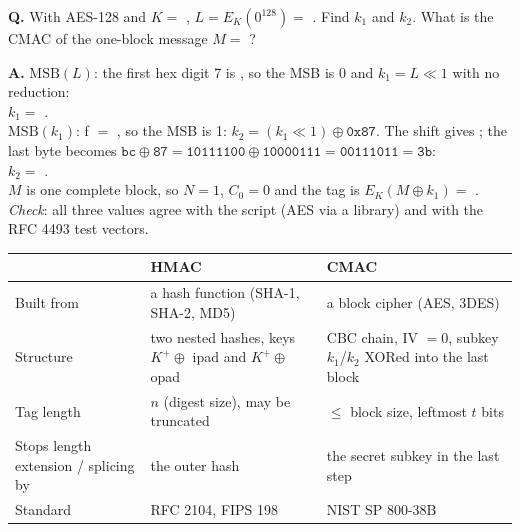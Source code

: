 \begin{worked}
\textbf{Q.} With AES-128 and $K = $ , $L = E_K(0^{128}) = $ . Find $k_1$ and $k_2$. What is the CMAC of the one-block message $M = $ ?

\textbf{A.} $\mathrm{MSB}(L)$: the first hex digit 7 is , so the MSB is 0 and $k_1 = L \ll 1$ with no reduction:\\
$k_1 = $ .\\
$\mathrm{MSB}(k_1)$: f $=$ , so the MSB is 1: $k_2 = (k_1 \ll 1) \oplus \texttt{0x87}$. The shift gives ; the last byte becomes $\texttt{bc} \oplus \texttt{87} = \texttt{10111100} \oplus \texttt{10000111} = \texttt{00111011} = \texttt{3b}$:\\
$k_2 = $ .\\
$M$ is one complete block, so $N = 1$, $C_0 = 0$ and the tag is $E_K(M \oplus k_1) = $ .\\
\emph{Check}: all three values agree with the script (AES via a library) and with the RFC 4493 test vectors.
\end{worked}

\begin{center}\small
\begin{tabularx}{\textwidth}{@{}l X X@{}}
\toprule
 & HMAC & CMAC\\
\midrule
Built from & a hash function (SHA-1, SHA-2, MD5) & a block cipher (AES, 3DES)\\
Structure & two nested hashes, keys $K^+ \oplus$ ipad and $K^+ \oplus$ opad & CBC chain, IV $= 0$, subkey $k_1$/$k_2$ XORed into the last block\\
Tag length & $n$ (digest size), may be truncated & $\le$ block size, leftmost $t$ bits\\
Stops length extension / splicing by & the outer hash & the secret subkey in the last step\\
Standard & RFC 2104, FIPS 198 & NIST SP 800-38B\\
\bottomrule
\end{tabularx}
\end{center}

